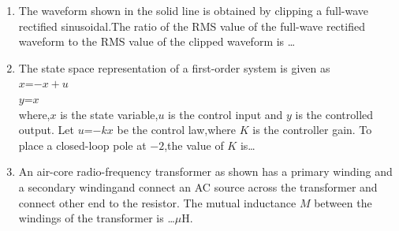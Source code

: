 \documentclass[journal]{IEEEtran}
\begin{document}
\begin{enumerate}
\begin{tikzpicture}[auto, node distance=2cm, >=latex']
\end{tikzpicture}

    \item The waveform shown in the solid line is obtained by clipping a full-wave rectified sinusoidal.The ratio of the RMS value of the full-wave rectified waveform to the RMS value of the clipped waveform is \dots\\

    \item The state space representation of a first-order system is given as \\
    $x$=$-x+u$\\
    $y$=$x$\\
    where,$x$ is the state variable,$u$ is the control input and $y$ is the controlled output. Let $u$=$-kx$ be the control law,where $K$ is the controller gain. To place a closed-loop pole at $-2$,the value of $K$ is\dots
    \item An air-core radio-frequency transformer as shown has a primary winding and a secondary windingand connect an AC source across the transformer and connect other end to the resistor. The mutual inductance $M$ between the windings of the transformer is \dots $\mu$H.\\
 

\end{enumerate}
\end{document}
